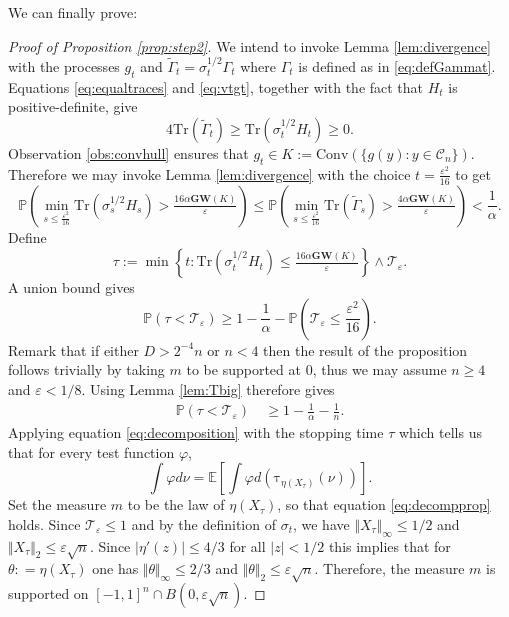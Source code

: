 \documentclass[12pt]{article}
\def \tilt{ \mathrm{\tau} }
\def \EE {\mathbb E}
\def \PP {\mathbb P}
\def \eps {\varepsilon}
\def \TTT {\mathcal{T}}
\def \tr {\mathrm{Tr}}
\def \DC {\mathcal{C}_n}
\def \MW {\mathbf{GW}}
\theoremstyle{definition}
\theoremstyle{remark}
\begin{document}
We can finally prove:
\begin{proof}[Proof of Proposition \ref{prop:step2}]
We intend to invoke Lemma \ref{lem:divergence} with the processes $g_t$ and $\tilde \Gamma_t = \sigma_t^{1/2} \Gamma_t$ where $\Gamma_t$ is defined as in \eqref{eq:defGammat}. Equations \eqref{eq:equaltraces} and \eqref{eq:vtgt}, together with the fact that $H_t$ is positive-definite, give
\begin{equation}\label{eq:traces2}
4 \tr \left (\tilde \Gamma_t \right ) \geq \tr \left (\sigma_t^{1/2} H_t \right ) \geq 0.
\end{equation}
Observation \ref{obs:convhull} ensures that $g_t \in K := \mathrm{Conv} \left ( \{g(y): y \in \DC \} \right ) $. Therefore we may invoke Lemma \ref{lem:divergence} with the choice $t = \frac{\eps^2}{16}$ to get
$$
\PP \left ( \min_{s \leq \tfrac{\eps^2}{16}} \tr \left (\sigma_s^{1/2} H_s \right ) > \tfrac{16 \alpha \MW(K)}{\eps} \right ) \leq \PP \left ( \min_{s \leq \tfrac{\eps^2}{16}} \tr(\tilde \Gamma_s) > \tfrac{4 \alpha \MW(K)}{\eps} \right ) < \frac{1}{\alpha}.
$$
Define
$$
\tau := \min \left  \{t : \tr \left (\sigma_t^{1/2} H_t \right ) \leq \tfrac{16 \alpha \MW(K) }{\eps} \right \} \wedge \TTT_\eps.
$$
A union bound gives
$$
\PP \left ( \tau < \TTT_\eps \right ) \geq 1 - \frac{1}{\alpha} - \PP \left (\TTT_\eps \leq \frac{\eps^2}{16} \right ).
$$
Remark that if either $D > 2^{-4} n$ or $n < 4$ then the result of the proposition follows trivially by taking $m$ to be supported at $0$, thus we may assume $n \geq 4$ and $\eps < 1/8$. Using Lemma \ref{lem:Tbig} therefore gives
\begin{align}\label{eq:taubound1}
\PP \left ( \tau < \TTT_{\eps} \right ) ~& \geq 1 - \frac{1}{\alpha} - \frac{1}{n}.
\end{align}
Applying equation \eqref{eq:decomposition} with the stopping time $\tau$ which tells us that for every test function $\varphi$,
$$
\int \varphi d \nu = \EE \left [ \int \varphi d \left ( \tilt_{\eta(X_\tau)} (\nu) \right ) \right ].
$$
Set the measure $m$ to be the law of $\eta(X_\tau)$, so that equation \eqref{eq:decompprop} holds. Since $\TTT_\eps \leq 1$ and by the definition of $\sigma_t$, we have $\Vert X_\tau \Vert_\infty \leq 1/2$ and $\Vert X_\tau \Vert_2 \leq \eps \sqrt{n}$. Since $|\eta'(z)| \leq 4/3$ for all $|z| < 1/2$ this implies that for $\theta : = \eta(X_\tau)$ one has $\Vert \theta \Vert_\infty \leq 2/3$ and $\Vert \theta \Vert_2 \leq \eps \sqrt{n}$. Therefore, the measure $m$ is supported on $[-1,1]^n \cap B(0, \eps \sqrt{n})$. 


\end{proof}
\end{document}
